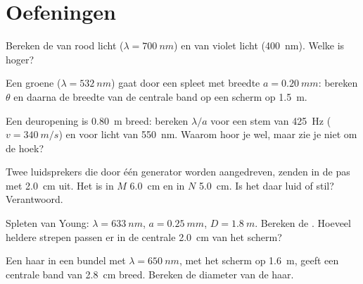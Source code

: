 \section{Oefeningen}

\begin{exercise}[$\star$]\label{exo:g12:light-as-wave:1}
Bereken de  van rood licht ($\lambda = \qty{700}{nm}$) en van
violet licht (\qty{400}{nm}). Welke is hoger?
\end{exercise}

\begin{exercise}[$\star$]\label{exo:g12:light-as-wave:2}
Een groene  ($\lambda = \qty{532}{nm}$) gaat door een spleet met
breedte $a = \qty{0.20}{mm}$: bereken $\theta$ en daarna de breedte van de
centrale band op een scherm op \qty{1.5}{m}.
\end{exercise}

\begin{exercise}[$\star$]\label{exo:g12:light-as-wave:3}
Een deuropening is \qty{0.80}{m} breed: bereken $\lambda/a$ voor een stem
van \qty{425}{Hz} ($v = \qty{340}{m/s}$) en voor licht van \qty{550}{nm}.
Waarom hoor je wel, maar zie je niet om de hoek?
\end{exercise}

\begin{exercise}[$\star$]\label{exo:g12:light-as-wave:4}
Twee luidsprekers die door één generator worden aangedreven, zenden in de
pas  met  \qty{2.0}{cm} uit. Het  is in
$M$ \qty{6.0}{cm} en in $N$ \qty{5.0}{cm}. Is het daar luid of stil?
Verantwoord.
\end{exercise}

\begin{exercise}[$\star$]\label{exo:g12:light-as-wave:5}
Spleten van Young: $\lambda = \qty{633}{nm}$, $a = \qty{0.25}{mm}$,
$D = \qty{1.8}{m}$. Bereken de . Hoeveel heldere strepen
passen er in de centrale \qty{2.0}{cm} van het scherm?
\end{exercise}

\begin{exercise}[$\star\star$]\label{exo:g12:light-as-wave:6}
Een haar in een bundel met $\lambda = \qty{650}{nm}$, met het scherm op
\qty{1.6}{m}, geeft een centrale band van \qty{2.8}{cm} breed. Bereken de
diameter van de haar.
\end{exercise}

